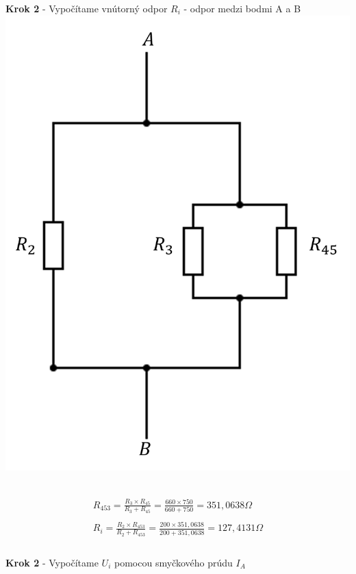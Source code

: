 \begin{center}
    \textbf{Krok 2} - Vypočítame vnútorný odpor $R_{i}$  - odpor medzi bodmi A a B
    \includegraphics[scale=0.5,keepaspectratio]{fig/pr2_2.png} \
\end{center}

\begin{gather*}
    R_{453} = \frac {R_{3} \times R_{45}} {R_{3} + R_{45}} =  \frac {660 \times 750} {660 + 750} = 351,0638 \Omega \\\\
   R_{i} = \frac {R_{2} \times R_{453}} {R_{2} + R_{453}} = \frac {200 \times 351,0638} {200 + 351,0638} = 127,4131 \Omega \\\\
\end{gather*}

\begin{center}
    \textbf{Krok 2} - Vypočítame $U_i$ pomocou smyčkového prúdu $I_A$
\end{center}

